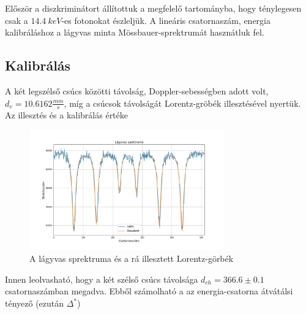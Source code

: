 \documentclass[a4paper,12pt]{article}
\begin{document}
\par Először a diszkriminátort állítottuk a megfelelő tartományba, hogy ténylegesen csak a $14.4~keV$-es fotonokat észleljük. A lineáris csatornaszám, energia kalibráláshoz a lágyvas minta Mössbauer-sprektrumát hasznátluk fel.

\subsection{Kalibrálás}

\par A két legszélső csúcs közötti távolság, Doppler-sebességben adott volt, $d_{v} = 10.6162 \frac{mm}{s}$, míg a csúcsok távolságát Lorentz-gröbék illesztésével nyertük. Az illesztés és a kalibrálás értéke

\begin{figure}[!htb]
\centering
\includegraphics[width=0.75\textwidth]{vas.png}
\caption{A lágyvas sprektruma és a rá illesztett Lorentz-görbék}
\end{figure}

\par Innen leolvasható, hogy a két szélső csúcs távolsága $d_{ch} = 366.6 \pm 0.1$ csatornaszámban megadva. Ebből számolható a az energia-csatorna átvátálsi tényező (ezután $\Delta^{*}$)
\end{document}
